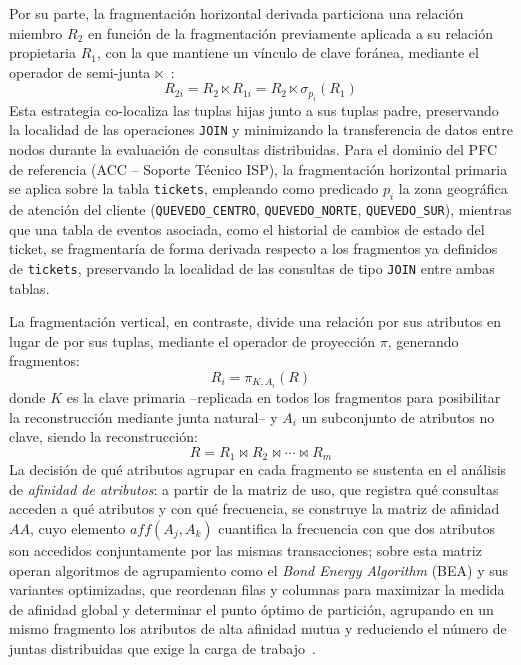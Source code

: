 \documentclass[11pt,a4paper]{article}
\begin{document}
Por su parte, la fragmentaci\'on horizontal derivada particiona una relaci\'on
miembro $R_2$ en funci\'on de la fragmentaci\'on previamente aplicada a su
relaci\'on propietaria $R_1$, con la que mantiene un v\'inculo de clave
for\'anea, mediante el operador de semi-junta $\ltimes$~\cite{nashat2018,ge2024}:
\begin{equation}
R_{2i} = R_2 \ltimes R_{1i} = R_2 \ltimes \sigma_{p_i}(R_1)
\end{equation}
Esta estrategia co-localiza las tuplas hijas junto a sus tuplas padre,
preservando la localidad de las operaciones \texttt{JOIN} y minimizando la
transferencia de datos entre nodos durante la evaluaci\'on de consultas
distribuidas. Para el dominio del PFC de referencia (ACC -- Soporte T\'ecnico
ISP), la fragmentaci\'on horizontal primaria se aplica sobre la tabla
\texttt{tickets}, empleando como predicado $p_i$ la zona geogr\'afica de
atenci\'on del cliente (\texttt{QUEVEDO\_CENTRO}, \texttt{QUEVEDO\_NORTE},
\texttt{QUEVEDO\_SUR}), mientras que una tabla de eventos asociada, como el
historial de cambios de estado del ticket, se fragmentar\'ia de forma derivada
respecto a los fragmentos ya definidos de \texttt{tickets}, preservando la
localidad de las consultas de tipo \texttt{JOIN} entre ambas tablas.

La fragmentaci\'on vertical, en contraste, divide una relaci\'on por sus
atributos en lugar de por sus tuplas, mediante el operador de proyecci\'on
$\pi$, generando fragmentos:
\begin{equation}
R_i = \pi_{K, A_i}(R)
\end{equation}
donde $K$ es la clave primaria --replicada en todos los fragmentos para
posibilitar la reconstrucci\'on mediante junta natural-- y $A_i$ un
subconjunto de atributos no clave, siendo la reconstrucci\'on:
\begin{equation}
R = R_1 \bowtie R_2 \bowtie \cdots \bowtie R_m
\end{equation}
La decisi\'on de qu\'e atributos agrupar en cada fragmento se sustenta en el
an\'alisis de \emph{afinidad de atributos}: a partir de la matriz de uso, que
registra qu\'e consultas acceden a qu\'e atributos y con qu\'e frecuencia, se
construye la matriz de afinidad $AA$, cuyo elemento $\mathit{aff}(A_j,A_k)$
cuantifica la frecuencia con que dos atributos son accedidos conjuntamente
por las mismas transacciones; sobre esta matriz operan algoritmos de
agrupamiento como el \emph{Bond Energy Algorithm} (BEA) y sus variantes
optimizadas, que reordenan filas y columnas para maximizar la medida de
afinidad global y determinar el punto \'optimo de partici\'on, agrupando en
un mismo fragmento los atributos de alta afinidad mutua y reduciendo el
n\'umero de juntas distribuidas que exige la carga de trabajo~\cite{mehta2022,ge2024}.
\end{document}
